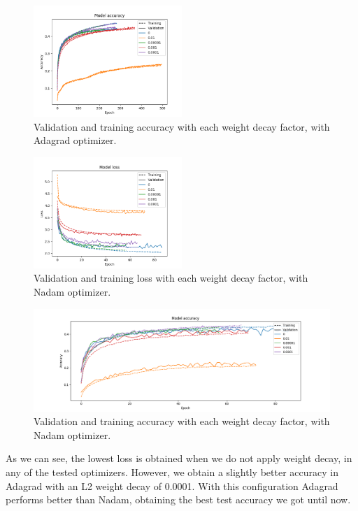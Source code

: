 \documentclass[]{article}
\begin{document}
\begin{figure}[H]
	\centering
	\includegraphics[width=0.5\textwidth]{weight2_adagrad_acc}
	\caption{Validation and training accuracy with each weight decay factor, with Adagrad optimizer.}
	\label{f:ker6}
\end{figure}

\begin{figure}[H]
	\centering
	\includegraphics[width=0.5\textwidth]{weight2_nadam_loss}
	\caption{Validation and training loss with each weight decay factor, with Nadam optimizer.}
	\label{f:ker7}
\end{figure}

\begin{figure}[H]
	\centering
	\includegraphics[width=\textwidth]{weight2_nadam_acc}
	\caption{Validation and training accuracy with each weight decay factor, with Nadam optimizer.}
	\label{f:ker8}
\end{figure}

As we can see, the lowest loss is obtained when we do not apply weight decay, in any of the tested optimizers. However, we obtain a slightly better accuracy in Adagrad with an L2 weight decay of 0.0001. With this configuration Adagrad performs better than Nadam, obtaining the best test accuracy we got until now.
\end{document}
